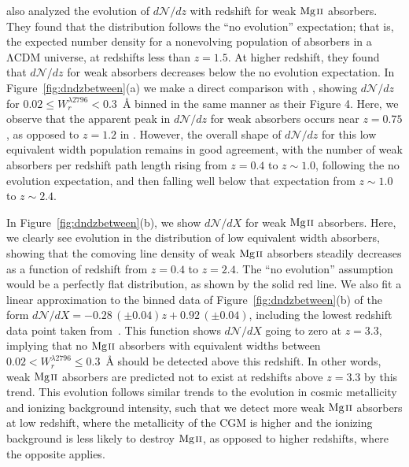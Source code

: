 \documentclass[iop,apj,numberedappendix,appendixfloats,twocolappendix]{emulateapj}
\begin{document}
\cite{Narayanan2007} also analyzed the evolution of $d\mathcal{N}\!/dz$ with redshift for weak ${\hbox{{\rm Mg}\kern 0.1em{\sc ii}}}$ absorbers. They found that the distribution follows the ``no evolution'' expectation; that is, the expected number density for a nonevolving population of absorbers in a $\mathrm{\Lambda CDM}$ universe, at redshifts less than $z = 1.5$. At higher redshift, they found that $d\mathcal{N}\!/dz$ for weak absorbers decreases below the no evolution expectation. In Figure~\ref{fig:dndzbetween}(a) we make a direct comparison with \cite{Narayanan2007}, showing $d\mathcal{N}\!/dz$ for $0.02 \le W_r^{\lambda2796} < 0.3$~{\AA} binned in the same manner as their Figure 4. Here, we observe that the apparent peak in $d\mathcal{N}\!/dz$ for weak absorbers occurs near $z = 0.75$, as opposed to $z = 1.2$ in \cite{Narayanan2007}. However, the overall shape of $d\mathcal{N}\!/dz$ for this low equivalent width population remains in good agreement, with the number of weak absorbers per redshift path length rising from $z = 0.4$ to $z \sim 1.0$, following the no evolution expectation, and then falling well below that expectation from $z \sim 1.0$ to $z \sim 2.4$.

In Figure~\ref{fig:dndzbetween}(b), we show $d\mathcal{N}\!/dX$ for weak ${\hbox{{\rm Mg}\kern 0.1em{\sc ii}}}$ absorbers. Here, we clearly see evolution in the distribution of low equivalent width absorbers, showing that the comoving line density of weak ${\hbox{{\rm Mg}\kern 0.1em{\sc ii}}}$ absorbers steadily decreases as a function of redshift from $z = 0.4$ to $z = 2.4$. The ``no evolution'' assumption would be a perfectly flat distribution, as shown by the solid red line. We also fit a linear approximation to the binned data of Figure~\ref{fig:dndzbetween}(b) of the form $d\mathcal{N}\!/dX = -0.28\,(\pm0.04) z + 0.92\,(\pm0.04)$, including the lowest redshift data point taken from~\cite{Narayanan2005}. This function shows $d\mathcal{N}\!/dX$ going to zero at $z = 3.3$, implying that no ${\hbox{{\rm Mg}\kern 0.1em{\sc ii}}}$ absorbers with equivalent widths between $0.02 < W_{r}^{\lambda2796} \le 0.3$~{\AA} should be detected above this redshift. In other words, weak ${\hbox{{\rm Mg}\kern 0.1em{\sc ii}}}$ absorbers are predicted not to exist at redshifts above $z = 3.3$ by this trend. This evolution follows similar trends to the evolution in cosmic metallicity and ionizing background intensity, such that we detect more weak ${\hbox{{\rm Mg}\kern 0.1em{\sc ii}}}$ absorbers at low redshift, where the metallicity of the CGM is higher and the ionizing background is less likely to destroy ${\hbox{{\rm Mg}\kern 0.1em{\sc ii}}}$, as opposed to higher redshifts, where the opposite applies.
\end{document}

